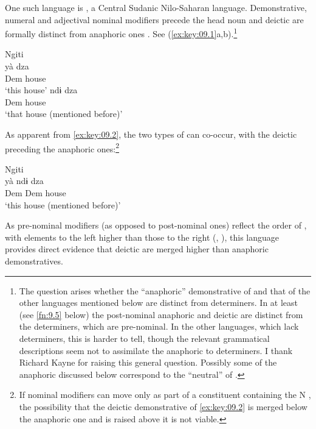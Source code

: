 \documentclass[output=paper]{langsci/langscibook}
\begin{document}
One such language is , a Central Sudanic Nilo-Saharan
language.  Demonstrative, numeral and adjectival nominal modifiers precede the
head noun \parencite[§9]{KutschLojenga1994} and deictic  are
formally distinct from anaphoric ones
\parencite[cf.][§§9.5.1--9.5.2]{KutschLojenga1994}. See (\ref{ex:key:09.1}a,b).\footnote{The
    question arises whether the “anaphoric” demonstrative of  and that of the
    other languages mentioned below are distinct from determiners. In
     at
    least (see \cref{fn:9.5} below) the post-nominal anaphoric and deictic
     are distinct from the determiners, which are pre-nominal. In
    the other languages, which lack determiners, this is harder to tell, though
    the relevant grammatical descriptions seem not to assimilate the anaphoric
     to determiners. I thank Richard Kayne for raising this
    general question. Possibly some of the anaphoric  discussed
below correspond to the “neutral”  of \textcite[§11]{Kayne2014}.}

\ea\label{ex:key:09.1}Ngiti \parencite[373, 375]{KutschLojenga1994}\\
\ea\label{ex:key:09.1a}
		\gll yà dza\\
			Dem house\\
		\glt ‘this house’
    \ex\label{ex:key:09.1b}
		\gll  ndɨ          dza\\
			Dem house\\
		\glt ‘that house (mentioned before)’
	\z
\z

As apparent from \eqref{ex:key:09.2}, the two types of  can
co-occur, with the deictic  preceding the anaphoric
ones:\footnote{If nominal modifiers can move only as part of a constituent
    containing the N \citep{Cinque2005}, the possibility that the
deictic demonstrative of \eqref{ex:key:09.2} is merged below the
anaphoric one and is raised above it is not viable.}

\ea\label{ex:key:09.2}Ngiti \parencite[376]{KutschLojenga1994}\\
    \gll yà             ndɨ         dza   \\
            Dem Dem house\\
    \glt ‘this house (mentioned before)’
\z

As pre-nominal modifiers (as opposed to post-nominal ones) reflect the order of
, with elements to the left higher than those to the right
(\citealt{Kayne1994}, \citealt{Cinque2009,Cinque2017}), this language provides
direct evidence that deictic  are merged higher than anaphoric
demonstratives.
\end{document}
